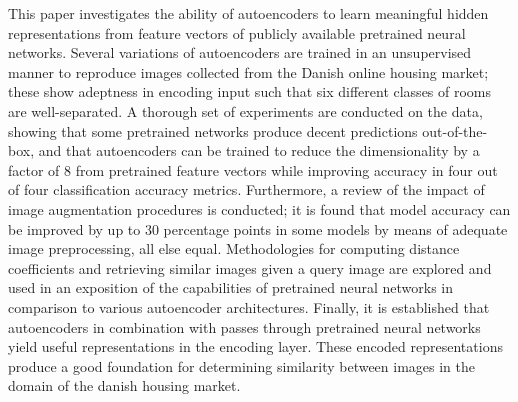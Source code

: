 This paper investigates the ability of autoencoders to learn meaningful hidden representations from feature vectors of publicly available pretrained neural networks.
Several variations of autoencoders are trained in an unsupervised manner to reproduce images collected from the Danish online housing market; these show adeptness in encoding input such that six different classes of rooms are well-separated.
\newline
\newline
A thorough set of experiments are conducted on the data, showing that some pretrained networks produce decent predictions out-of-the-box, and that autoencoders can be trained to reduce the dimensionality by a factor of 8 from pretrained feature vectors while improving accuracy in four out of four classification accuracy metrics.
Furthermore, a review of the impact of image augmentation procedures is conducted; it is found that model accuracy can be improved by up to 30 percentage points in some models by means of adequate image preprocessing, all else equal. 
\newline
Methodologies for computing distance coefficients and retrieving similar images given a query image are explored and used in an exposition of the capabilities of pretrained neural networks in comparison to various autoencoder architectures.
\newline
\newline
Finally, it is established that autoencoders in combination with passes through pretrained neural networks yield useful representations in the encoding layer. 
These encoded representations produce a good foundation for determining similarity between images in the domain of the danish housing market.




